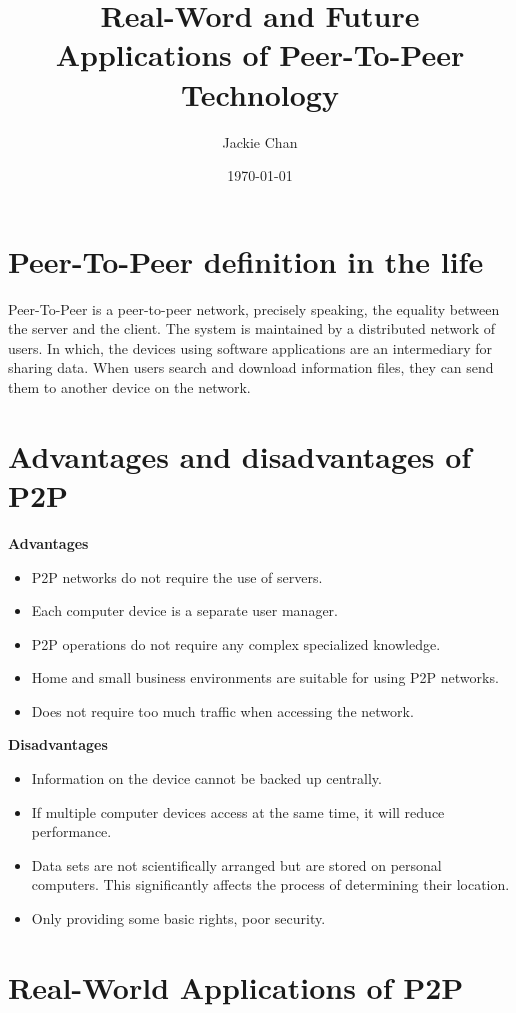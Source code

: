 \documentclass{article}
\title{Real-Word and Future Applications of Peer-To-Peer Technology}
\author{Jackie Chan}
\date{\today}
\begin{document}
	\maketitle
	
	\section{Peer-To-Peer definition in the life}
	
	Peer-To-Peer is a peer-to-peer network, precisely speaking, the equality between the server and the client. The system is maintained by a distributed network of users. In which, the devices using software applications are an intermediary for sharing data. When users search and download information files, they can send them to another device on the network.
	
	\section{Advantages and disadvantages of P2P}
	
	\textbf{Advantages}
	\begin{itemize}
		\item P2P networks do not require the use of servers.
		\item Each computer device is a separate user manager.
		\item P2P operations do not require any complex specialized knowledge.
		\item Home and small business environments are suitable for using P2P networks.
		\item Does not require too much traffic when accessing the network.
	\end{itemize}
	
	\textbf{Disadvantages}
	\begin{itemize}
		\item Information on the device cannot be backed up centrally.
		\item If multiple computer devices access at the same time, it will reduce performance.
		\item Data sets are not scientifically arranged but are stored on personal computers. This significantly affects the process of determining their location.
		\item Only providing some basic rights, poor security.
	\end{itemize}
	
	\section{Real-World Applications of P2P}
	
\end{document}

